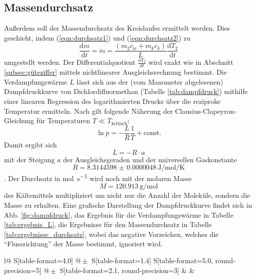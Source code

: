 \subsection{Massendurchsatz}
  Außerdem soll der Massendurchsatz des Kreislaufes ermittelt werden. Dies geschieht, indem (\ref{eqn:durchsatz1}) und (\ref{eqn:durchsatz2}) zu
  \begin{equation}
    \frac{\mathrm{d}m}{\mathrm{d}t} = \dot m = \frac{(m_{2} c_w + m_k c_k)}{L}\frac {\mathrm{d}T_{2}}{\mathrm{d}t}
  \end{equation}
  umgestellt werden. Der Differentialquotient $\frac {\mathrm{d}T_{2}}{\mathrm{d}t}$ wird exakt wie in Abschnitt \ref{subsec:güteziffer} mittels nichtlinearer Ausgleichsrechnung bestimmt. Die Verdampfungswärme $L$ lässt sich aus der (vom Manometer abgelesenen) Dampfdruckkurve von Dichlordifluormethan (Tabelle \ref{tab:dampfdruck}) mithilfe einer linearen Regression des logarithmierten Drucks über die reziproke Temperatur ermitteln. Nach \cite{anleitung203} gilt folgende Näherung der Clausius-Clapeyron-Gleichung für Temperaturen $T \ll T_\mathrm{kritisch}$:
  \begin{equation}
    \ln p = -\frac{L}{R} \frac {1}{T} + \mathrm{const.}
  \end{equation}
  Damit ergibt sich
  \begin{equation}
    L = -R \cdot a
  \end{equation}
  mit der Steigung $a$ der Ausgleichsgeraden und der universellen Gaskonstante
  \begin{equation}
    R = \SI[separate-uncertainty=false]{8.3144598(48)}{\joule\per\mol\per\kelvin}
  \end{equation}
  \cite{codata}. Der Durchsatz in \si{\mol\per\second} wird noch mit der molaren Masse
  \begin{equation}
    M = \SI{120.913}{\gram\per\mol}
  \end{equation}
  \cite[267]{gase} des Kältemittels multipliziert um nicht nur die Anzahl der Moleküle, sondern die Masse zu erhalten. Eine grafische Darstellung der Dampfdruckkurve findet sich in Abb. \ref {fig:dampfdruck}, das Ergebnis für die Verdampfungswärme in Tabelle \ref{tab:ergebnis_L}, die Ergebnisse für den Massendurchsatz in Tabelle \ref{tab:ergebnisse_durchsatz}, wobei das negative Vorzeichen, welches die \enquote{Flussrichtung} der Masse bestimmt, ignoriert wird.

  \begin{table}[htbp]
    \centering
    \caption{Ermittelte Steigung und Verdampfungswärme.}
    \label{tab:ergebnis_L}
    \begin{tabular}{
        l@{}
        S[table-format=4.0] @{${}\pm{}$} S[table-format=1.4]
        S[table-format=5.0, round-precision=5] @{${}\pm{}$} S[table-format=2.1, round-precision=3]}
      \toprule
      & 
      &  \\
      \midrule
      
      \bottomrule
    \end{tabular}
  \end{table}

